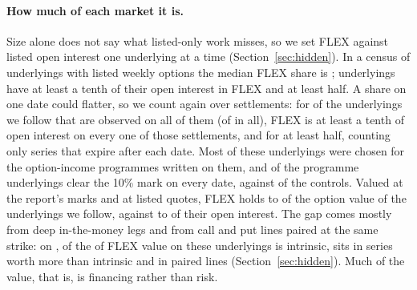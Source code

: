 \documentclass[11pt]{article}
\begin{document}
\paragraph{How much of each market it is.} Size alone does not say what listed-only
work misses, so we set FLEX against listed open interest one underlying at a time
(Section~\ref{sec:hidden}). In a census of \HiddenCensusUnderlyings{} underlyings with
listed weekly options the median FLEX share is \HiddenCensusMedian{}; \HiddenCensusTen{}
underlyings have at least a tenth of their open interest in FLEX and \HiddenCensusHalf{}
at least half. A share on one date could flatter, so we count again over
\HiddenDailyDates{} settlements: for \HiddenStableTen{} of the \HiddenDailyComplete{}
underlyings we follow that are observed on all of them (of \HiddenDailyUniverse{} in
all), FLEX is at least a tenth of open interest on every one of
those settlements, and for \HiddenStableHalfNames{} at least half, counting only series
that expire after each date. Most of these
underlyings were chosen for the option-income programmes written on them, and
\HiddenStableTenProgramme{} of the \HiddenCompleteProgramme{} programme underlyings clear
the 10\% mark on every date, against \HiddenStableTenControl{} of the
\HiddenCompleteControl{} controls. Valued at the report's marks and at listed quotes,
FLEX holds \HiddenValueLow{} to \HiddenValueHigh{} of the option value of the
underlyings we follow, against \HiddenValueOpenInterestLow{} to
\HiddenValueOpenInterestHigh{} of their open interest. The gap comes mostly from deep
in-the-money legs and from call and put lines paired at the same strike: on
\HiddenValueCompositionDate{}, \HiddenValueIntrinsic{} of the \HiddenValueFlexTotal{} of
FLEX value on these underlyings is intrinsic, \HiddenValueDeep{} sits in series worth more than
\HiddenValueDeepThreshold{} intrinsic and \HiddenValuePaired{} in paired lines
(Section~\ref{sec:hidden}). Much of the value, that is, is financing rather than risk.
\end{document}
